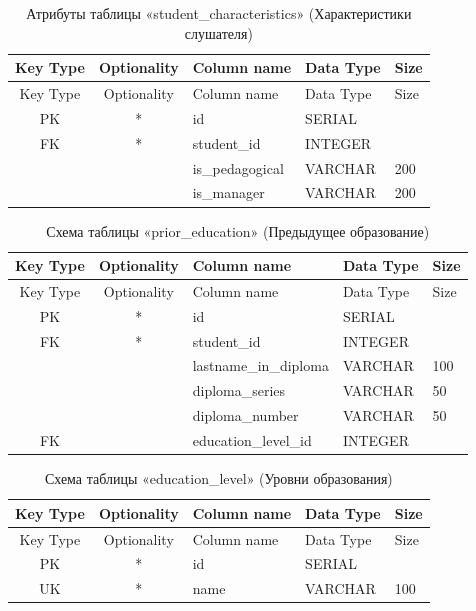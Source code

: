\begin{xltabular}{\textwidth}{|c|c|l|l|X|}
	\caption{Атрибуты таблицы «student\_characteristics» (Характеристики слушателя)\label{tab:characteristics}}\\ \hline
	\centrow Key Type & \centrow Optionality & \centrow Column name & \centrow Data Type & \centrow Size \\ \hline
	\endfirsthead
	\centrow Key Type & \centrow Optionality & \centrow Column name & \centrow Data Type & \centrow Size \\ \hline
	\finishhead
	PK & * & id & SERIAL & \\ \hline
	FK & * & student\_id & INTEGER & \\ \hline
	& & is\_pedagogical & VARCHAR & 200 \\ \hline
	& & is\_manager & VARCHAR & 200 \\ \hline
\end{xltabular}

\begin{xltabular}{\textwidth}{|c|c|l|l|X|}
	\caption{Схема таблицы «prior\_education» (Предыдущее образование)\label{tab:prior_education}}\\ \hline
	\centrow Key Type & \centrow Optionality & \centrow Column name & \centrow Data Type & \centrow Size \\ \hline
	\endfirsthead
	\centrow Key Type & \centrow Optionality & \centrow Column name & \centrow Data Type & \centrow Size \\ \hline
	\finishhead
	PK & * & id & SERIAL & \\ \hline
	FK & * & student\_id & INTEGER & \\ \hline
	& & lastname\_in\_diploma & VARCHAR & 100 \\ \hline
	& & diploma\_series & VARCHAR & 50 \\ \hline
	& & diploma\_number & VARCHAR & 50 \\ \hline
	FK & & education\_level\_id & INTEGER & \\ \hline
\end{xltabular}

\begin{xltabular}{\textwidth}{|c|c|l|l|X|}
	\caption{Схема таблицы «education\_level» (Уровни образования)\label{tab:education_level}}\\ \hline
	\centrow Key Type & \centrow Optionality & \centrow Column name & \centrow Data Type & \centrow Size \\ \hline
	\endfirsthead
	\centrow Key Type & \centrow Optionality & \centrow Column name & \centrow Data Type & \centrow Size \\ \hline
	\finishhead
	PK & * & id & SERIAL & \\ \hline
	UK & * & name & VARCHAR & 100 \\ \hline
\end{xltabular}

